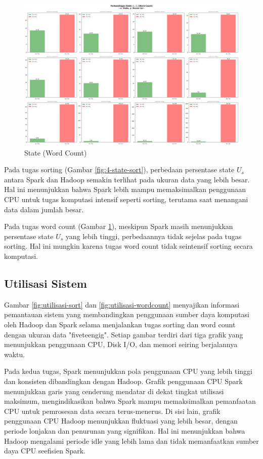 \begin{figure}[h]
    \centering
    \includegraphics[width=1\textwidth]{figures/ch04/4-state-wordcount.png}
    \caption{State (Word Count)}
    \label{fig:4-state-wordcount}
\end{figure}

Pada tugas sorting (Gambar \ref{fig:4-state-sort}), perbedaan persentase state $U_s$ antara Spark dan Hadoop semakin terlihat pada ukuran data yang lebih besar. Hal ini menunjukkan bahwa Spark lebih mampu memaksimalkan penggunaan CPU untuk tugas komputasi intensif seperti sorting, terutama saat menangani data dalam jumlah besar.

Pada tugas word count (Gambar \ref{fig:4-state-wordcount}), meskipun Spark masih menunjukkan persentase state $U_s$ yang lebih tinggi, perbedaannya tidak sejelas pada tugas sorting. Hal ini mungkin karena tugas word count tidak seintensif sorting secara komputasi. 

\subsection{Utilisasi Sistem}
Gambar \ref{fig:utilisasi-sort} dan \ref{fig:utilisasi-wordcount} menyajikan informasi pemantauan sistem yang membandingkan penggunaan sumber daya komputasi oleh Hadoop dan Spark selama menjalankan tugas sorting dan word count dengan ukuran data "fiveteengig". Setiap gambar terdiri dari tiga grafik yang menunjukkan penggunaan CPU, Disk I/O, dan memori seiring berjalannya waktu. 

Pada kedua tugas, Spark menunjukkan pola penggunaan CPU yang lebih tinggi dan konsisten dibandingkan dengan Hadoop. Grafik penggunaan CPU Spark menunjukkan garis yang cenderung mendatar di dekat tingkat utilisasi maksimum, mengindikasikan bahwa Spark mampu memaksimalkan pemanfaatan CPU untuk pemrosesan data secara terus-menerus. Di sisi lain, grafik penggunaan CPU Hadoop menunjukkan fluktuasi yang lebih besar, dengan periode lonjakan dan penurunan yang signifikan. Hal ini menunjukkan bahwa Hadoop mengalami periode idle yang lebih lama dan tidak memanfaatkan sumber daya CPU seefisien Spark. 

